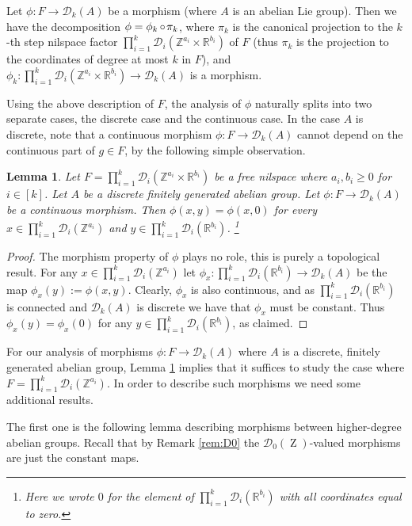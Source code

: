 \documentclass[a4paper,12pt,reqno]{amsart}
\newtheorem{lemma}[theorem]{Lemma}
\theoremstyle{definition}
\def\to{\rightarrow}
\newcommand{\mc}{\mathcal}
\newcommand{\mb}{\mathbb}
\DeclareMathOperator{\ab}{Z}
\DeclareMathOperator{\co}{\circ\hspace{-0.02 cm}}
\begin{document}
Let $\phi:F\to \mc{D}_k(A)$ be a morphism (where $A$ is an abelian Lie group). Then we have the decomposition $\phi = \phi_k \co \pi_k$, where $\pi_k$ is the canonical projection to the $k$-th step nilspace factor $\prod_{i=1}^k \mc{D}_i(\mb{Z}^{a_i}\times \mb{R}^{b_i})$ of $F$ (thus $\pi_k$ is the projection to the coordinates of degree at most $k$ in $F$), and $\phi_k:\prod_{i=1}^k \mc{D}_i(\mb{Z}^{a_i}\times \mb{R}^{b_i})\to \mc{D}_k(A)$ is a morphism.

Using the above description of $F$, the analysis of $\phi$ naturally splits into two separate cases, the discrete case and the continuous case. In the case $A$ is discrete, note that a continuous morphism $\phi:F\to \mc{D}_k(A)$ cannot depend on the continuous part of $g\in F$, by the following simple observation.

\begin{lemma}\label{lem:non-dep-cont-coord}
Let $F=\prod_{i=1}^k \mc{D}_i(\mb{Z}^{a_i}\times \mb{R}^{b_i})$ be a free nilspace where $a_i,b_i\ge 0$ for $i\in[k]$. Let $A$ be a discrete finitely generated abelian group. Let $\phi:F\to \mc{D}_k(A)$ be a continuous morphism. Then  $\phi(x,y)=\phi(x,0)$
for every $x\in \prod_{i=1}^k \mc{D}_i(\mb{Z}^{a_i})$ and $y\in \prod_{i=1}^k \mc{D}_i(\mb{R}^{b_i})$. \footnote{Here we wrote $0$ for the element of $\prod_{i=1}^k \mc{D}_i(\mb{R}^{b_i})$ with all coordinates equal to zero.}
\end{lemma}
\begin{proof}
The morphism property of $\phi$ plays no role, this is purely a topological result. For any $x\in \prod_{i=1}^k\mc{D}_i(\mb{Z}^{a_i})$ let $\phi_x:\prod_{i=1}^k\mc{D}_i(\mb{R}^{b_i})\to \mc{D}_k(A)$ be the map $\phi_x(y):=\phi(x,y)$. Clearly, $\phi_x$ is also continuous, and as $\prod_{i=1}^k\mc{D}_i(\mb{R}^{b_i})$ is connected and $\mc{D}_k(A)$ is discrete we have that $\phi_x$ must be constant. Thus $\phi_x(y)=\phi_x(0)$ for any $y\in \prod_{i=1}^k\mc{D}_i(\mb{R}^{b_i})$, as claimed.
\end{proof}

\noindent For our analysis of morphisms $\phi:F\to \mc{D}_k(A)$ where $A$ is a discrete, finitely generated abelian group, Lemma \ref{lem:non-dep-cont-coord} implies that it suffices to study the case where $F=\prod_{i=1}^k \mc{D}_i(\mb{Z}^{a_i})$. In order to describe such morphisms we need some additional results.

The first one is the following lemma describing morphisms between higher-degree abelian groups. Recall that by Remark \ref{rem:D0} the  $\mc{D}_0(\ab)$-valued morphisms are just the constant maps.
\end{document}
